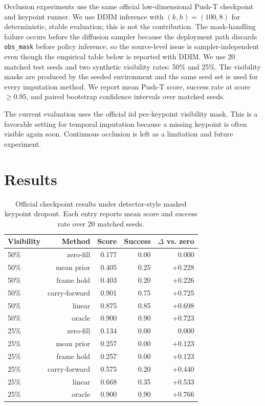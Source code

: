 \documentclass{article}
\begin{document}
Occlusion experiments use the same official low-dimensional Push-T checkpoint and keypoint runner. We use DDIM inference with $(k,h)=(100,8)$ for deterministic, stable evaluation; this is not the contribution. The mask-handling failure occurs before the diffusion sampler because the deployment path discards \texttt{obs\_mask} before policy inference, so the source-level issue is sampler-independent even though the empirical table below is reported with DDIM. We use 20 matched test seeds and two synthetic visibility rates: 50\% and 25\%. The visibility masks are produced by the seeded environment and the same seed set is used for every imputation method. We report mean Push-T score, success rate at score $\geq 0.95$, and paired bootstrap confidence intervals over matched seeds.

The current evaluation uses the official iid per-keypoint visibility mask. This is a favorable setting for temporal imputation because a missing keypoint is often visible again soon. Continuous occlusion is left as a limitation and future experiment.

\section{Results}

\begin{table}[t]
\centering
\caption{Official checkpoint results under detector-style masked keypoint dropout. Each entry reports mean score and success rate over 20 matched seeds.}
\begin{tabular}{lrrrr}
\toprule
Visibility & Method & Score & Success & $\Delta$ vs. zero \\
\midrule
50\% & zero-fill & 0.177 & 0.00 & 0.000 \\
50\% & mean prior & 0.405 & 0.25 & +0.228 \\
50\% & frame hold & 0.403 & 0.20 & +0.226 \\
50\% & carry-forward & 0.901 & 0.75 & +0.725 \\
50\% & linear & 0.875 & 0.85 & +0.698 \\
50\% & oracle & 0.900 & 0.90 & +0.723 \\
\midrule
25\% & zero-fill & 0.134 & 0.00 & 0.000 \\
25\% & mean prior & 0.257 & 0.00 & +0.123 \\
25\% & frame hold & 0.257 & 0.00 & +0.123 \\
25\% & carry-forward & 0.575 & 0.20 & +0.440 \\
25\% & linear & 0.668 & 0.35 & +0.533 \\
25\% & oracle & 0.900 & 0.90 & +0.766 \\
\bottomrule
\end{tabular}
\end{table}
\end{document}
